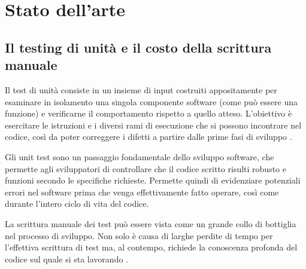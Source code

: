 \chapter{Stato dell'arte}
\label{ch:stato_arte}

%

%


\section{Il testing di unità e il costo della scrittura manuale}
\label{sec:testing}

Il test di unità consiste in un insieme di input costruiti appositamente per esaminare in isolamento una singola componente software (come può essere una funzione) e verificarne il comportamento rispetto a quello atteso. L'obiettivo è esercitare le istruzioni e i diversi rami di esecuzione che si possono incontrare nel codice, così da poter correggere i difetti a partire dalle prime fasi di sviluppo \cite{huang2025ult}.

Gli unit test sono un passaggio fondamentale dello sviluppo software, che permette agli sviluppatori di controllare che il codice scritto risulti robusto e funzioni secondo le specifiche richieste. Permette quindi di evidenziare potenziali errori nel software prima che venga effettivamente fatto operare, così come durante l'intero ciclo di vita del codice. 

La scrittura manuale dei test può essere vista come un grande collo di bottiglia nel processo di sviluppo. Non solo è causa di larghe perdite di tempo per l'effettiva scrittura di test ma, al contempo, richiede la conoscenza profonda del codice sul quale si sta lavorando \cite{schaefer2024testpilot}.

